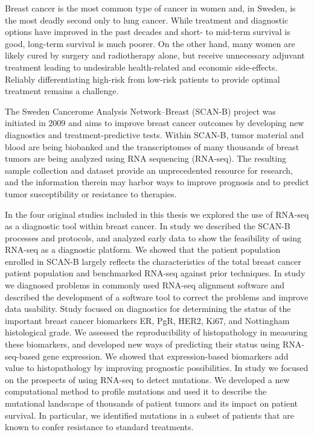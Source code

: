 \documentclass[11pt]{book}
\newcommand{\scanb}{\mbox{SCAN-B}}
\begin{document}

\renewcommand*{\thefootnote}{\arabic{footnote}}



Breast cancer is the most common type of cancer in women and, in Sweden, is the most deadly second only to lung cancer. While treatment and diagnostic options have improved in the past decades and short- to mid-term survival is good, long-term survival is much poorer. On the other hand, many women are likely cured by surgery and radiotherapy alone, but receive unnecessary adjuvant treatment leading to undesirable health-related and economic side-effects. Reliably differentiating high-risk from low-risk patients to provide optimal treatment remains a challenge.

The Sweden Cancerome Analysis Network--Breast (\scanb{}) project was initiated in 2009 and aims to improve breast cancer outcomes by developing new diagnostics and treatment-predictive tests. Within \scanb{}, tumor material and blood are being biobanked and the transcriptomes of many thousands of breast tumors are being analyzed using RNA sequencing (RNA-seq). The resulting sample collection and dataset provide an unprecedented resource for research, and the information therein may harbor ways to improve prognosis and to predict tumor susceptibility or resistance to therapies.

In the four original studies included in this thesis we explored the use of RNA-seq as a diagnostic tool within breast cancer. In study \I we described the \scanb{} processes and protocols, and analyzed early data to show the feasibility of using RNA-seq as a diagnostic platform. We showed that the patient population enrolled in \scanb{} largely reflects the characteristics of the total breast cancer patient population and benchmarked RNA-seq against prior techniques. In study \II we diagnosed problems in commonly used RNA-seq alignment software and described the development of a software tool to correct the problems and improve data usability. Study \III focused on diagnostics for determining the status of the important breast cancer biomarkers ER, PgR, HER2, Ki67, and Nottingham histological grade. We assessed the reproducibility of histopathology in measuring these biomarkers, and developed new ways of predicting their status using RNA-seq-based gene expression. We showed that expression-based biomarkers add value to histopathology by improving prognostic possibilities. In study \IV we focused on the prospects of using RNA-seq to detect mutations. We developed a new computational method to profile mutations and used it to describe the mutational landscape of thousands of patient tumors and its impact on patient survival. In particular, we identified mutations in a subset of patients that are known to confer resistance to standard treatments.
\end{document}
